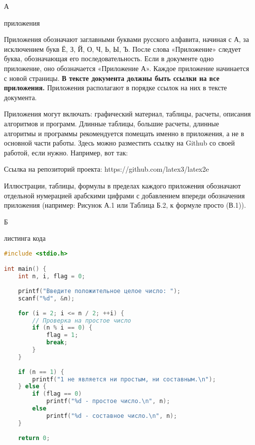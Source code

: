 \documentclass{report}
\begin{document}
\begin{flushright}
      А
\end{flushright}

\begin{center}   приложения \end{center}

Приложения обозначают заглавными буквами русского алфавита, начиная с А, за исключением букв Ё, З, Й, О, Ч, Ь, Ы, Ъ. После слова «Приложение» следует буква, обозначающая его последовательность.
Если в документе одно приложение, оно обозначается «Приложение А».
Каждое приложение начинается с новой страницы.
{\bf В тексте документа должны быть ссылки на все приложения.}  Приложения располагают в порядке ссылок на них в тексте документа.

Приложения могут включать: графический материал, таблицы, расчеты, описания алгоритмов и программ. Длинные таблицы, большие расчеты, длинные алгоритмы и программы рекомендуется помещать именно в приложения, а не в основной части работы. Здесь можно разместить ссылку на Github со своей работой, если нужно. Например, вот так:

Ссылка на репозиторий проекта: https://github.com/latex3/latex2e

Иллюстрации, таблицы, формулы в пределах каждого приложения обозначают отдельной нумерацией арабскими цифрами с добавлением впереди обозначения приложения (например: Рисунок А.1 или Таблица Б.2, к формуле просто (В.1)).
\newpage

\begin{flushright}
      Б
\end{flushright}

\begin{center}   листинга кода \end{center}

\begin{lstlisting}[language=C, frame=single]  
#include <stdio.h>

int main() {
    int n, i, flag = 0;
    
    printf("Введите положительное целое число: ");
    scanf("%d", &n);
    
    for (i = 2; i <= n / 2; ++i) {
        // Проверка на простое число
        if (n % i == 0) {
            flag = 1;
            break;
        }
    }
    
    if (n == 1) {
        printf("1 не является ни простым, ни составным.\n");
    } else {
        if (flag == 0)
            printf("%d - простое число.\n", n);
        else
            printf("%d - составное число.\n", n);
    }
    
    return 0;
\end{lstlisting}
\newpage
\end{document}
